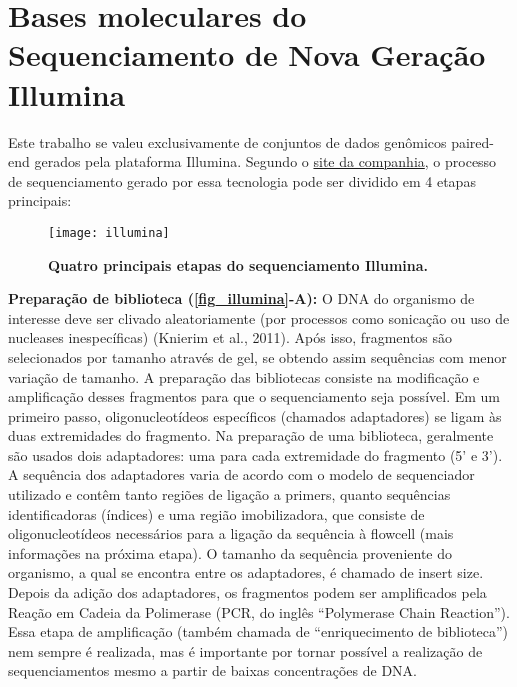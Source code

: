 \documentclass[../DISSERTACAO_MAIN.tex]{subfiles}
\begin{document}
\section{Bases moleculares do Sequenciamento de Nova Geração Illumina}

Este trabalho se valeu exclusivamente de conjuntos de dados genômicos paired-end gerados pela plataforma Illumina. Segundo o \href{https://www.illumina.com/documents/products/illumina\_sequencing\_introduction.pdf}{site da companhia}, o processo de sequenciamento gerado por essa tecnologia pode ser dividido em 4 etapas principais:

\begin{figure}[htb]
	\texttt{[image: illumina]}
	\caption[Principais etapas do sequenciamento Illumina]{\textbf{Quatro principais etapas do sequenciamento Illumina.}}
	\label{fig_illumina}
\end{figure}


\textbf{Preparação de biblioteca (\autoref{fig_illumina}-A):} O DNA do organismo de interesse deve ser clivado aleatoriamente (por processos como sonicação ou uso de nucleases inespecíficas) (Knierim et al., 2011). Após isso, fragmentos são selecionados por tamanho através de gel, se obtendo assim sequências com menor variação de tamanho. A preparação das bibliotecas consiste na modificação e amplificação desses fragmentos para que o sequenciamento seja possível. Em um primeiro passo, oligonucleotídeos específicos (chamados adaptadores) se ligam às duas extremidades do fragmento. Na preparação de uma biblioteca, geralmente são usados dois adaptadores: uma para cada extremidade do fragmento (5’ e 3’). A sequência dos adaptadores varia de acordo com o modelo de sequenciador utilizado e contêm tanto regiões de ligação a primers, quanto sequências identificadoras (índices) e uma região imobilizadora, que consiste de oligonucleotídeos necessários para a ligação da sequência à flowcell (mais informações na próxima etapa). O tamanho da sequência proveniente do organismo, a qual se encontra entre os adaptadores, é chamado de insert size. Depois da adição dos adaptadores, os fragmentos podem ser amplificados pela Reação em Cadeia da Polimerase (PCR, do inglês “Polymerase Chain Reaction”). Essa etapa de amplificação (também chamada de “enriquecimento de biblioteca”) nem sempre é realizada, mas é importante por tornar possível a realização de sequenciamentos mesmo a partir de baixas concentrações de DNA. 
\end{document}
